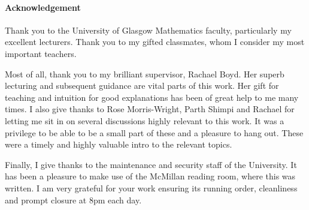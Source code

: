\documentclass[class=article, crop=false]{standalone}
\begin{document}
\paragraph{Acknowledgement}
Thank you to the University of Glasgow Mathematics faculty, particularly my excellent lecturers. Thank you to my gifted classmates, whom I consider my most important teachers.

Most of all, thank you to my brilliant supervisor, Rachael Boyd. Her superb lecturing and subsequent guidance are vital parts of this work. Her gift for teaching and intuition for good explanations has been of great help to me many times. I also give thanks to Rose Morris-Wright, Parth Shimpi and Rachael for letting me sit in on several discussions highly relevant to this work. It was a privilege to be able to be a small part of these and a pleasure to hang out. These were a timely and highly valuable intro to the relevant topics.

Finally, I give thanks to the maintenance and security staff of the University. It has been a pleasure to make use of the McMillan reading room, where this was written. I am very grateful for your work ensuring its running order, cleanliness and prompt closure at 8pm each day.
\end{document}
